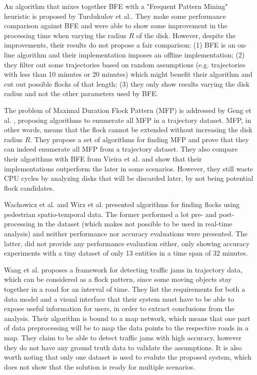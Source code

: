 An algorithm that mixes together BFE \citep{vieira} with a "Frequent Pattern Mining" heuristic is proposed by Turdukulov
et al.. They make some performance comparison against BFE and were able to show some improvement in the processing time
when varying the radius $R$ of the disk. However, despite the improvements, their results do not propose a fair
comparison: (1) BFE is an on-line algorithm and their implementation imposes an offline implementation; (2) they filter
out some trajectories based on random assumptions (e.g. trajectories with less than 10 minutes or 20 minutes) which
might benefit their algorithm and cut out possible flocks of that length; (3) they only show results varying the disk
radius and not the other parameters used by BFE.

The problem of Maximal Duration Flock Pattern (MFP) is addressed by Geng et al. \citep{enumeration}, proposing
algorithms to enumerate all MFP in a trajectory dataset. MFP, in other words, means that the flock cannot be extended
without increasing the disk radius $R$. They propose a set of algorithms for finding MFP and prove that they can indeed
enumerate all MFP from a trajectory dataset. They also compare their algorithms with BFE from Vieira et al.
\citep{vieira} and show that their implementations outperform the later in some scenarios. However, they still waste CPU
cycles by analyzing disks that will be discarded later, by not being potential flock candidates.

Wachowicz et al. and Wirz et al. \citep{flockpedestrian} \citep{pedestriancanyons} presented algorithms for finding
flocks using pedestrian spatio-temporal data. The former performed a lot pre- and post-processing in the dataset (which
makes not possible to be used in real-time analysis) and neither performance nor accuracy evaluations were presented.
The latter, did not provide any performance evaluation either, only showing accuracy experiments with a tiny dataset of
only 13 entities in a time span of 32 minutes.

Wang et al. \citep{visualtrafficjam} proposes a framework for detecting traffic jams in trajectory data, which can be
considered as a flock pattern, since some moving objects stay together in a road for an interval of time. They list the
requirements for both a data model and a visual interface that their system must have to be able to expose useful
information for users, in order to extract conclusions from the analysis. Their algorithm is bound to a map network,
which means that one part of data preprocessing will be to map the data points to the respective roads in a map. They
claim to be able to detect traffic jams with high accuracy, however they do not have any ground truth data to validate
the assumptions. It is also worth noting that only one dataset is used to evalute the proposed system, which does not
show that the solution is ready for multiple scenarios.

